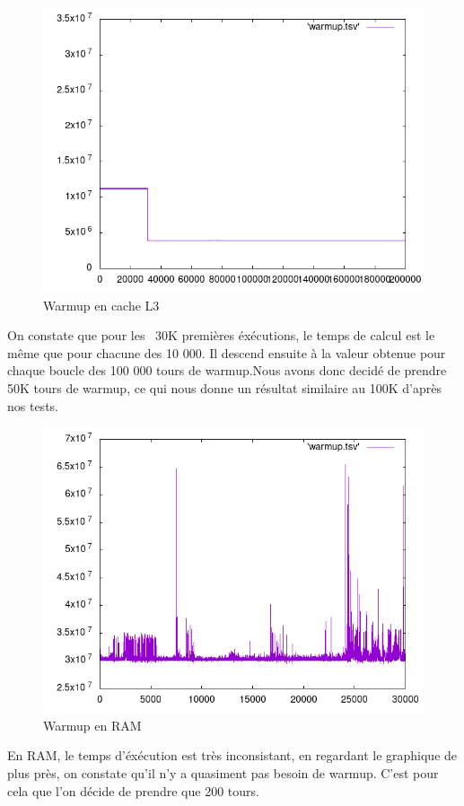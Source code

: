\documentclass{report}
\begin{document}
\newpage
    \begin{figure}[ht!]
        \centering
        \includegraphics[width=120mm]{MEDIA/warmupL3_200000.png}
        \caption{Warmup en cache L3 }
    \end{figure}

    On constate que pour les ~30K premières éxécutions, le temps de calcul est le même que pour chacune des 10 000. Il descend ensuite à la valeur obtenue pour chaque boucle des 100 000 tours de warmup.Nous avons donc decidé de prendre 50K tours de warmup, ce qui nous donne un résultat similaire au 100K d'après nos tests.
   \newpage
   \begin{figure}[ht!]
        \centering
        \includegraphics[width=120mm]{MEDIA/warmupRAM.png}
        \caption{Warmup en RAM }
    \end{figure}
En RAM, le temps d'éxécution est très inconsistant, en regardant le graphique de plus près, on constate qu'il n'y a quasiment pas besoin de warmup. C'est pour cela que l'on décide de prendre que 200 tours.
\newpage
\end{document}
